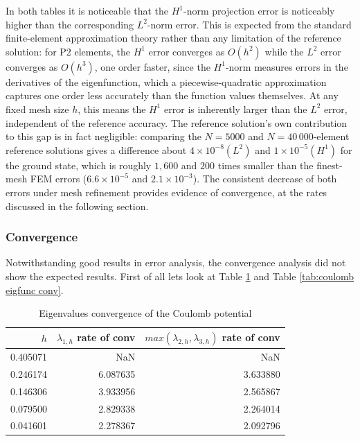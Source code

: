\documentclass[acmsmall,screen]{MapleTrans}
\begin{document}
In both tables it is noticeable that the $H^1$-norm projection error is noticeably higher than the corresponding $L^2$-norm error. This is expected from the standard finite-element approximation theory rather than any limitation of the reference solution: for P2 elements, the $H^1$ error converges as $O(h^2)$ while the $L^2$ error converges as $O(h^3)$, one order faster, since the $H^1$-norm measures errors in the derivatives of the eigenfunction, which a piecewise-quadratic approximation captures one order less accurately than the function values themselves. At any fixed mesh size $h$, this means the $H^1$ error is inherently larger than the $L^2$ error, independent of the reference accuracy. The reference solution's own contribution to this gap is in fact negligible: comparing the $N = 5000$ and $N = 40\,000$-element reference solutions gives a difference about $4 \times 10^{-8} (L^2)$ and $1 \times 10^{-5} (H^1)$ for the ground state, which is roughly $1,600$ and $200$ times smaller than the finest-mesh FEM errors ($6.6 \times 10^{-5}$ and $2.1 \times 10^{-3}$). The consistent decrease of both errors under mesh refinement provides evidence of convergence, at the rates discussed in the following section.

\subsubsection{Convergence}
Notwithstanding good results in error analysis, the convergence analysis did not show the expected results. First of all lets look at Table \ref{tab:coulomb eigval conv} and Table \ref{tab:coulomb eigfunc conv}.
\begin{table}[H]
    \centering
    \caption{Eigenvalues convergence of the Coulomb potential}
    \label{tab:coulomb eigval conv}
    \begin{tabular}{rrr}
        \toprule
        $h$ & $\lambda_{1,h}$ rate of conv & $max(\lambda_{2,h}, \lambda_{3,h})$ rate of conv \\
        \midrule
        0.405071 & NaN & NaN \\
        0.246174 & 6.087635 & 3.633880 \\
        0.146306 & 3.933956 & 2.565867 \\
        0.079500 & 2.829338 & 2.264014 \\
        0.041601 & 2.278367 & 2.092796 \\
        \bottomrule
    \end{tabular}
\end{table}
\end{document}
